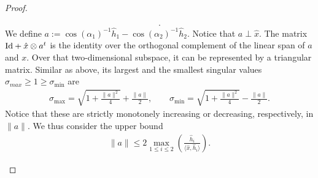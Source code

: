 \documentclass[10pt,a4paper]{article}
\begin{document}
\begin{proof}
\begin{itemize}
\begin{align*}
            .
        \end{align*}
        We define $a := \cos(\alpha_1)^{-1} \hat h_1 - \cos(\alpha_2)^{-1} \hat h_2$. 
        Notice that $a \perp \hat x$. The matrix ${\rm Id} + \hat x \otimes a^{t}$ is the identity over the orthogonal complement of the linear span of $a$ and $x$. Over that two-dimensional subspace, it can be represented by a triangular matrix.
        Similar as above, its largest and the smallest singular values $\sigma_{max} \geq 1 \geq \sigma_{\min}$ are
        \begin{align*}
            \sigma_{\max} = \sqrt{ 1 + \frac{ \|a\|^{2} }{ 4 } } + \frac{ \|a\| }{2},
            \qquad 
            \sigma_{\min} = \sqrt{ 1 + \frac{ \|a\|^{2} }{ 4 } } - \frac{ \|a\| }{2}.     
        \end{align*}
        Notice that these are strictly monotonely increasing or decreasing, respectively, in $\|a\|$.
        We thus consider the upper bound 
        \begin{align*}
            \|a\| 
            \leq 
            2 \max_{1 \leq i \leq 2} 
            \left( 
                \frac{ \hat h_i }{ \langle \hat x, \hat h_i \rangle } 
            \right)
            .
        \end{align*}


\end{itemize}
\end{proof}
\end{document}

